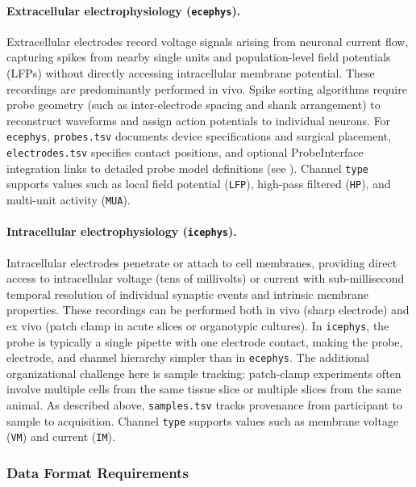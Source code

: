 \documentclass[fleqn,10pt]{article}
\begin{document}
\paragraph*{Extracellular electrophysiology (\texttt{ecephys}).}\label{sec:ecephys}
Extracellular electrodes record voltage signals arising from neuronal current flow, capturing spikes from nearby single units and population-level field potentials (LFPs) without directly accessing intracellular membrane potential.
These recordings are predominantly performed in vivo.
Spike sorting algorithms require probe geometry (such as inter-electrode spacing and shank arrangement) to reconstruct waveforms and assign action potentials to individual neurons.
For \texttt{ecephys}, \verb|probes.tsv| documents device specifications and surgical placement, \verb|electrodes.tsv| specifies contact positions, and optional ProbeInterface integration links to detailed probe model definitions (see ).
Channel \texttt{type} supports values such as local field potential (\texttt{LFP}), high-pass filtered (\texttt{HP}), and multi-unit activity (\texttt{MUA}).

\paragraph*{Intracellular electrophysiology (\texttt{icephys}).}\label{sec:icephys}
Intracellular electrodes penetrate or attach to cell membranes, providing direct access to intracellular voltage (tens of millivolts) or current with sub-millisecond temporal resolution of individual synaptic events and intrinsic membrane properties.
These recordings can be performed both in vivo (sharp electrode) and ex vivo (patch clamp in acute slices or organotypic cultures).
In \texttt{icephys}, the probe is typically a single pipette with one electrode contact, making the probe, electrode, and channel hierarchy simpler than in \texttt{ecephys}.
The additional organizational challenge here is sample tracking: patch-clamp experiments often involve multiple cells from the same tissue slice or multiple slices from the same animal.
As described above, \verb|samples.tsv| tracks provenance from participant to sample to acquisition.
Channel \texttt{type} supports values such as membrane voltage (\texttt{VM}) and current (\texttt{IM}).


\subsubsection*{Data Format Requirements}\label{sec:data-format-requirements}
\end{document}
